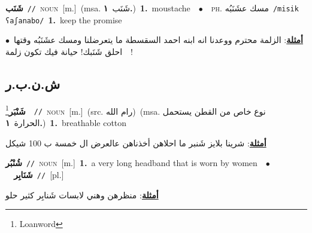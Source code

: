\documentclass[10pt,a4paper,twoside]{article} %
\begin{document}
\begin{multicols}{2}
{\setlength\topsep{0pt}\textbf{\foreignlanguage{arabic}{شَنَب}}\ {\color{gray}\texttt{//}\color{black}}\ \textsc{noun}\ [m.]\ \color{gray}(msa. \foreignlanguage{arabic}{شَنَب}~\foreignlanguage{arabic}{\textbf{١.}})\color{black}\ \textbf{1.}~moustache\ \ $\bullet$\ \ \textsc{ph.} \color{gray} \foreignlanguage{arabic}{مسك عشَنَبُه}\color{black}\ {\color{gray}\texttt{/{\sffamily misik ʕaʃanabo}/}\color{black}}\ \textbf{1.}~keep the promise\  \begin{flushright}\color{gray}\foreignlanguage{arabic}{\textbf{\underline{\foreignlanguage{arabic}{أمثلة}}}: الزلمة محترم ووعدنا انه ابنه احمد السقسطة ما يتعرضلنا ومسك عشَنَبُه وقتها\ $\bullet$\ \  احلق شَنَبك! حيانة فيك تكون زلمة!}\end{flushright}\color{black}} \vspace{2mm}

\vspace{-3mm}
\subsection*{\color{blue}\foreignlanguage{arabic}{ش.ن.ب.ر}\color{blue}{}} 

{\setlength\topsep{0pt}\textbf{\foreignlanguage{arabic}{شَنْبَر}}\footnote{Loanword}\ \ {\color{gray}\texttt{//}\color{black}}\ \textsc{noun}\ [m.]\ (src. \color{gray}\foreignlanguage{arabic}{رام الله}\color{black})\ \color{gray}(msa. \foreignlanguage{arabic}{نوع خاص من القطن يستحمل الحرارة}~\foreignlanguage{arabic}{\textbf{١.}})\color{black}\ \textbf{1.}~breathable cotton\  \begin{flushright}\color{gray}\foreignlanguage{arabic}{\textbf{\underline{\foreignlanguage{arabic}{أمثلة}}}: شرينا بلايز شَنبر ما احلاهن أخذناهن عالعرض ال خمسة ب 100 شيكل}\end{flushright}\color{black}} \vspace{2mm}

{\setlength\topsep{0pt}\textbf{\foreignlanguage{arabic}{شُنْبُر}}\ {\color{gray}\texttt{//}\color{black}}\ \textsc{noun}\ [m.]\ \textbf{1.}~a very long headband that is worn by women\ \ $\bullet$\ \ \setlength\topsep{0pt}\textbf{\foreignlanguage{arabic}{شَنَابِر}}\ {\color{gray}\texttt{//}\color{black}}\ [pl.]\  \begin{flushright}\color{gray}\foreignlanguage{arabic}{\textbf{\underline{\foreignlanguage{arabic}{أمثلة}}}: منظرهن وهني لابسات شَنابِر كثير حلو}\end{flushright}\color{black}} \vspace{2mm}


\end{multicols}
\end{document}

